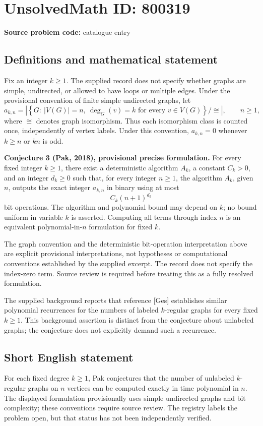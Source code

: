 \documentclass[11pt]{article}
\begin{document}
\section*{UnsolvedMath ID: 800319}
\textbf{Source problem code:} catalogue entry
\subsection{Definitions and mathematical statement}
Fix an integer \(k\ge 1\). The supplied record does not specify whether graphs are simple, undirected, or allowed to have loops or multiple edges. Under the provisional convention of finite simple undirected graphs, let
\[
 a_{k,n}=\left|\left\{G:\ |V(G)|=n,\ \deg_G(v)=k\text{ for every }v\in V(G)\right\}/\cong\right|,
 \qquad n\ge 1,
\]
where \(\cong\) denotes graph isomorphism. Thus each isomorphism class is counted once, independently of vertex labels. Under this convention, \(a_{k,n}=0\) whenever \(k\ge n\) or \(kn\) is odd.

\textbf{Conjecture 3 (Pak, 2018), provisional precise formulation.} For every fixed integer \(k\ge 1\), there exist a deterministic algorithm \(A_k\), a constant \(C_k>0\), and an integer \(d_k\ge 0\) such that, for every integer \(n\ge 1\), the algorithm \(A_k\), given \(n\), outputs the exact integer \(a_{k,n}\) in binary using at most
\[
 C_k(n+1)^{d_k}
\]
bit operations. The algorithm and polynomial bound may depend on \(k\); no bound uniform in variable \(k\) is asserted. Computing all terms through index \(n\) is an equivalent polynomial-in-\(n\) formulation for fixed \(k\).

The graph convention and the deterministic bit-operation interpretation above are explicit provisional interpretations, not hypotheses or computational conventions established by the supplied excerpt. The record does not specify the index-zero term. Source review is required before treating this as a fully resolved formulation.

The supplied background reports that reference [Ges] establishes similar polynomial recurrences for the numbers of labeled \(k\)-regular graphs for every fixed \(k\ge 1\). This background assertion is distinct from the conjecture about unlabeled graphs; the conjecture does not explicitly demand such a recurrence.
\subsection{Short English statement}
For each fixed degree \(k\ge 1\), Pak conjectures that the number of unlabeled \(k\)-regular graphs on \(n\) vertices can be computed exactly in time polynomial in \(n\). The displayed formulation provisionally uses simple undirected graphs and bit complexity; these conventions require source review. The registry labels the problem open, but that status has not been independently verified.
\end{document}
